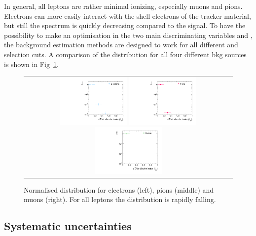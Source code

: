 In general, all leptons are rather minimal ionizing, especially muons and pions.
Electrons can more easily interact with the shell electrons of the tracker material, but still the \ias spectrum is quickly decreasing compared to the signal.
To have the possibility to make an optimisation in the two main discriminating variables \pt and \ias, the background estimation methods are designed to work for all different \pt and \ias selection cuts.
A comparison of the \ias distribution for all four different bkg sources is shown in Fig~\ref{fig:IasDist}.
\begin{figure}[!tb]
  \centering 
  \begin{tabular}{c}
    \includegraphics[width=0.33\textwidth]{figures/analysis/IasDistributionForElecs.pdf}
    \includegraphics[width=0.33\textwidth]{figures/analysis/IasDistributionForPions.pdf}
    \includegraphics[width=0.33\textwidth]{figures/analysis/IasDistributionForMuons.pdf}
  \end{tabular}
  \caption{Normalised \ias distribution for electrons (left), pions (middle) and muons (right). 
           For all leptons the \ias distribution is rapidly falling.}
  \label{fig:IasDist}
\end{figure}

\subsection{Systematic uncertainties}
\label{sec:SysUncertaintiesBkg}


